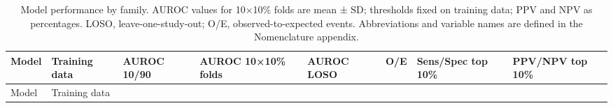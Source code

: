 \documentclass[
  11pt,
]{article}
\begin{document}
\begin{longtable}[]{@{}
  >{\raggedright\arraybackslash}p{}
  >{\raggedright\arraybackslash}p{}
  >{\raggedright\arraybackslash}p{}
  >{\raggedright\arraybackslash}p{}
  >{\raggedright\arraybackslash}p{}
  >{\raggedright\arraybackslash}p{}
  >{\raggedright\arraybackslash}p{}
  >{\raggedright\arraybackslash}p{}@{}}
\caption{Model performance by family. AUROC values for 10×10\% folds are
mean ± SD; thresholds fixed on training data; PPV and NPV as
percentages. LOSO, leave-one-study-out; O/E, observed-to-expected
events. Abbreviations and variable names are defined in the Nomenclature
appendix.}\tabularnewline
\toprule\noalign{}
\begin{minipage}[b]{\linewidth}\raggedright
Model
\end{minipage} & \begin{minipage}[b]{\linewidth}\raggedright
Training data
\end{minipage} & \begin{minipage}[b]{\linewidth}\raggedright
AUROC 10/90
\end{minipage} & \begin{minipage}[b]{\linewidth}\raggedright
AUROC 10×10\% folds
\end{minipage} & \begin{minipage}[b]{\linewidth}\raggedright
AUROC LOSO
\end{minipage} & \begin{minipage}[b]{\linewidth}\raggedright
O/E
\end{minipage} & \begin{minipage}[b]{\linewidth}\raggedright
Sens/Spec top 10\%
\end{minipage} & \begin{minipage}[b]{\linewidth}\raggedright
PPV/NPV top 10\%
\end{minipage} \\
\midrule\noalign{}
\endfirsthead
\toprule\noalign{}
\begin{minipage}[b]{\linewidth}\raggedright
Model
\end{minipage} & \begin{minipage}[b]{\linewidth}\raggedright
Training data
\end{minipage} & \begin{minipage}[b]{\linewidth}\raggedright

\end{minipage}
\end{longtable}
\end{document}
